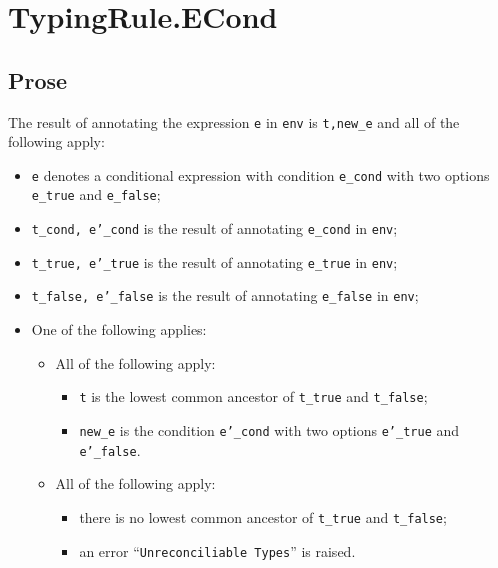 \documentclass{book}
\begin{document}

\section{TypingRule.ECond \label{sec:TypingRule.ECond}}

  \subsection{Prose}
  The result of annotating the expression \texttt{e} in \texttt{env} is
\texttt{t,new\_e} and all of the following apply:
  \begin{itemize}
  \item \texttt{e} denotes a conditional expression with condition \texttt{e\_cond} with two options \texttt{e\_true} and \texttt{e\_false};
  \item \texttt{t\_cond, e'\_cond} is the result of annotating \texttt{e\_cond} in \texttt{env};
  \item \texttt{t\_true, e'\_true} is the result of annotating \texttt{e\_true} in \texttt{env};
  \item \texttt{t\_false, e'\_false} is the result of annotating \texttt{e\_false} in \texttt{env};
  \item One of the following applies:
    \begin{itemize}
    \item All of the following apply:
      \begin{itemize}
      \item \texttt{t} is the lowest common ancestor of \texttt{t\_true} and \texttt{t\_false};
      \item \texttt{new\_e} is the condition \texttt{e'\_cond} with two options \texttt{e'\_true} and \texttt{e'\_false}.
      \end{itemize}
    \item All of the following apply:
      \begin{itemize}
      \item there is no lowest common ancestor of \texttt{t\_true} and \texttt{t\_false};
      \item an error ``\texttt{Unreconciliable Types}'' is raised.
      \end{itemize}
    \end{itemize}
  \end{itemize}
\end{document}
